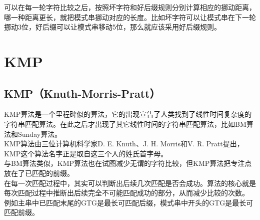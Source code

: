 可以在每一轮字符比较之后，按照坏字符和好后缀规则分别计算相应的挪动距离，哪一种距离更长，就把模式串挪动对应的长度。比如坏字符可以让模式串在下一轮挪动3位，好后缀可以让模式串移动5位，那么就应该采用好后缀规则。

\newpage

\section{KMP}

\subsection{KMP（Knuth-Morris-Pratt）}

KMP算法是一个里程碑似的算法，它的出现宣告了人类找到了线性时间复杂度的字符串匹配算法。在此之后才出现了其它线性时间的字符串匹配算法，比如BM算法和Sunday算法。\\

KMP算法由三位计算机科学家D. E. Knuth、J. H. Morris和V. R. Pratt提出，KMP这个算法名字正是取自这三个人的姓氏首字母。\\

与BM算法类似，KMP算法也在试图减少无谓的字符比较，但KMP算法把专注点放在了已匹配的前缀。\\

在每一次匹配过程中，其实可以判断出后续几次匹配是否会成功。算法的核心就是每次匹配过程中推断出后续完全不可能匹配成功的部分，从而减少比较的次数。\\

例如主串中已匹配末尾的GTG是最长可匹配后缀，模式串中开头的GTG是最长可匹配前缀。

\begin{table}[H]
	\centering
\end{table}

